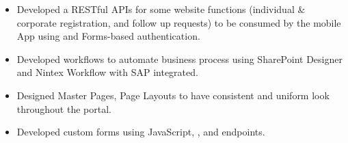 \documentclass[10pt,a4paper]{altacv}
\begin{document}
\begin{itemize}

\item Developed a RESTful APIs for some website functions (individual \& corporate registration, and follow up requests) to be consumed by the mobile App using  and Forms-based authentication. 

\end{itemize}

\divider

\begin {itemize}
\item Developed workflows to automate business process using SharePoint Designer and Nintex Workflow with SAP integrated.
\item Designed Master Pages, Page Layouts to have consistent and uniform look throughout the portal.
\item  Developed custom forms using JavaScript, , and  endpoints. 
\end{itemize}





\clearpage
\end{document}
